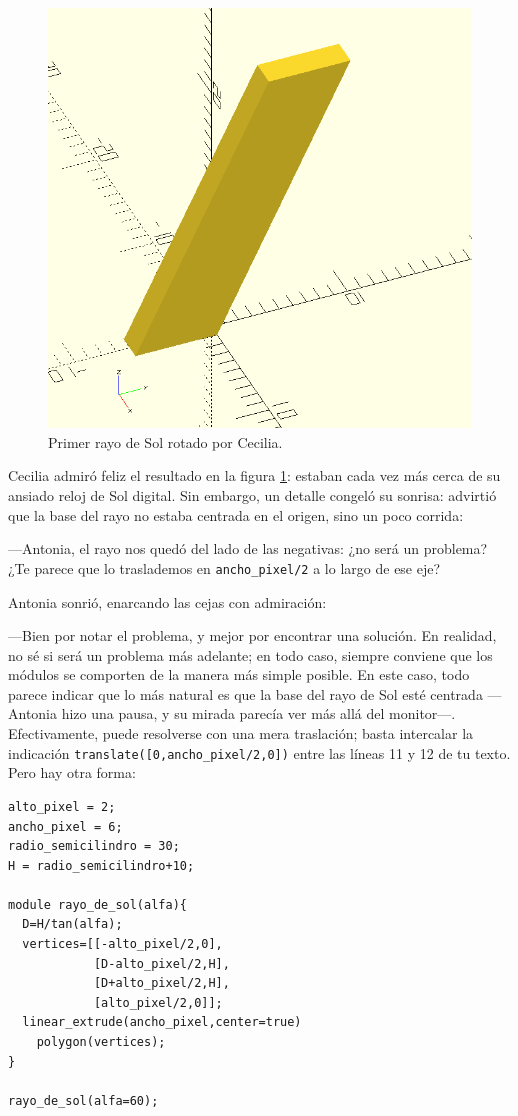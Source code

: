   \begin{figure}[t]
    \centering
  \includegraphics[width=.48\textwidth]{imagenes/rayo-extrudido-2}    
    \caption{Primer rayo de Sol rotado por Cecilia.}
    \label{fig:rayo-extrudido-2}
  \end{figure}

  

  Cecilia admiró feliz el resultado en la figura
  \ref{fig:rayo-extrudido-2}: estaban cada vez más cerca de su ansiado
  reloj de Sol digital. Sin embargo, un detalle congeló su sonrisa:
  advirtió que la base del rayo no estaba centrada en el origen, sino
  un poco corrida:

  ---Antonia, el rayo nos quedó del lado de las  negativas:
  ¿no será un problema? ¿Te parece que lo traslademos en
  \texttt{ancho\_pixel/2} a lo largo de ese eje?

  Antonia sonrió, enarcando las cejas con admiración:

  ---Bien por notar el problema, y mejor por encontrar una
  solución. En realidad, no sé si será un problema más adelante; en
  todo caso, siempre conviene que los módulos se comporten de la
  manera más simple posible. En este caso, todo parece indicar que lo
  más natural es que la base del rayo de Sol esté centrada ---Antonia
  hizo una pausa, y su mirada parecía ver más allá del monitor---.
  Efectivamente, puede resolverse con una mera traslación; basta
  intercalar la indicación \lstinline!translate([0,ancho_pixel/2,0])!
  entre las líneas 11 y 12 de tu texto. Pero hay otra forma:


    \begin{lstlisting}
alto_pixel = 2;
ancho_pixel = 6;
radio_semicilindro = 30;
H = radio_semicilindro+10;

module rayo_de_sol(alfa){
  D=H/tan(alfa);
  vertices=[[-alto_pixel/2,0],
            [D-alto_pixel/2,H],
            [D+alto_pixel/2,H],
            [alto_pixel/2,0]];
  linear_extrude(ancho_pixel,center=true)
    polygon(vertices);
}
 
rayo_de_sol(alfa=60);
\end{lstlisting}

